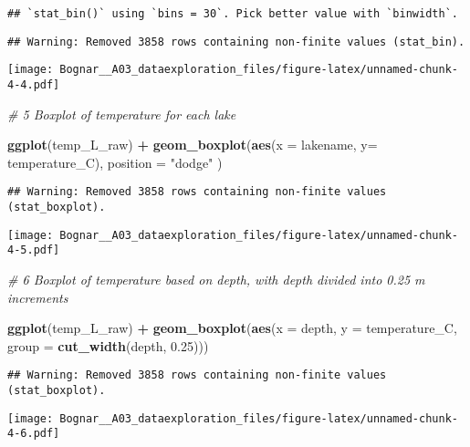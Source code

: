 \documentclass[]{article}
\newenvironment{Shaded}{\begin{snugshade}}{\end{snugshade}}
\newcommand{\KeywordTok}[1]{\textcolor[rgb]{0.13,0.29,0.53}{\textbf{#1}}}
\newcommand{\DataTypeTok}[1]{\textcolor[rgb]{0.13,0.29,0.53}{#1}}
\newcommand{\FloatTok}[1]{\textcolor[rgb]{0.00,0.00,0.81}{#1}}
\newcommand{\StringTok}[1]{\textcolor[rgb]{0.31,0.60,0.02}{#1}}
\newcommand{\CommentTok}[1]{\textcolor[rgb]{0.56,0.35,0.01}{\textit{#1}}}
\newcommand{\OperatorTok}[1]{\textcolor[rgb]{0.81,0.36,0.00}{\textbf{#1}}}
\newcommand{\NormalTok}[1]{#1}
\begin{document}
\begin{verbatim}
## `stat_bin()` using `bins = 30`. Pick better value with `binwidth`.
\end{verbatim}

\begin{verbatim}
## Warning: Removed 3858 rows containing non-finite values (stat_bin).
\end{verbatim}

\texttt{[image: Bognar\_\_A03\_dataexploration\_files/figure-latex/unnamed-chunk-4-4.pdf]}

\begin{Shaded}
\begin{Highlighting}[]
\CommentTok{# 5 Boxplot of temperature for each lake}

\KeywordTok{ggplot}\NormalTok{(temp_L_raw) }\OperatorTok{+}
\StringTok{   }\KeywordTok{geom_boxplot}\NormalTok{(}\KeywordTok{aes}\NormalTok{(}\DataTypeTok{x =}\NormalTok{ lakename, }\DataTypeTok{y=}\NormalTok{ temperature_C), }\DataTypeTok{position =} \StringTok{"dodge"}\NormalTok{ )}
\end{Highlighting}
\end{Shaded}

\begin{verbatim}
## Warning: Removed 3858 rows containing non-finite values (stat_boxplot).
\end{verbatim}

\texttt{[image: Bognar\_\_A03\_dataexploration\_files/figure-latex/unnamed-chunk-4-5.pdf]}

\begin{Shaded}
\begin{Highlighting}[]
\CommentTok{# 6 Boxplot of temperature based on depth, with depth divided into 0.25 m increments}

\KeywordTok{ggplot}\NormalTok{(temp_L_raw) }\OperatorTok{+}
\StringTok{   }\KeywordTok{geom_boxplot}\NormalTok{(}\KeywordTok{aes}\NormalTok{(}\DataTypeTok{x =}\NormalTok{ depth, }\DataTypeTok{y =}\NormalTok{ temperature_C, }\DataTypeTok{group =} \KeywordTok{cut_width}\NormalTok{(depth, }\FloatTok{0.25}\NormalTok{)))}
\end{Highlighting}
\end{Shaded}

\begin{verbatim}
## Warning: Removed 3858 rows containing non-finite values (stat_boxplot).
\end{verbatim}

\texttt{[image: Bognar\_\_A03\_dataexploration\_files/figure-latex/unnamed-chunk-4-6.pdf]}
\end{document}
